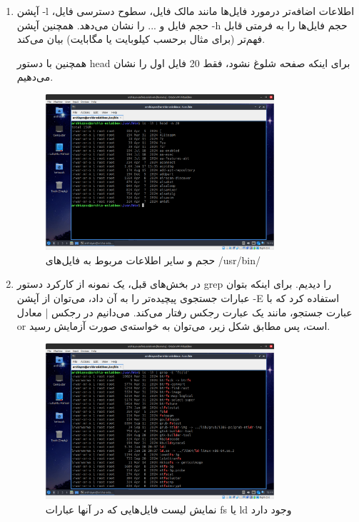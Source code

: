 \documentclass[12pt]{article}
\begin{document}
\begin{enumerate}
        \item
        آپشن 
        \textenglish{-l}
        اطلاعات اضافه‌تر درمورد فایل‌ها مانند مالک فایل، سطوح دسترسی فایل، حجم فایل و ... را نشان می‌دهد. همچنین آپشن
        \textenglish{-h}
        حجم فایل‌ها را به فرمتی قابل فهم‌تر (برای مثال برحسب کیلوبایت یا مگابایت) بیان می‌کند.

        همچنین با دستور
        head
        برای اینکه صفحه شلوغ نشود، فقط 20 فایل اول را نشان می‌دهیم.

        \begin{figure}[H]
		\centering
		\includegraphics[width=0.8\textwidth]{report1-resources/23.png}
		\caption{حجم و سایر اطلاعات مربوط به فایل‌های \textenglish{/usr/bin/}}
	\end{figure}

        \item 
        در بخش‌های قبل، یک نمونه از کارکرد دستور 
        grep
        را دیدیم. برای اینکه بتوان عبارات جستجوی پیچیده‌تر را به آن داد، می‌توان از آپشن
        \textenglish{-E}
        استفاده کرد که با عبارت جستجو، مانند یک عبارت رجکس رفتار می‌کند. می‌دانیم در رجکس
        \textenglish{|}
        معادل
        or 
        است، پس مطابق شکل زیر، می‌توان به خواسته‌ی صورت آزمایش رسید.

        \begin{figure}[H]
		\centering
		\includegraphics[width=0.8\textwidth]{report1-resources/24.png}
		\caption{نمایش لیست‌ فایل‌هایی که در آنها عبارات fs یا ld وجود دارد}
	\end{figure}
        
            
        \end{enumerate}
\end{document}
